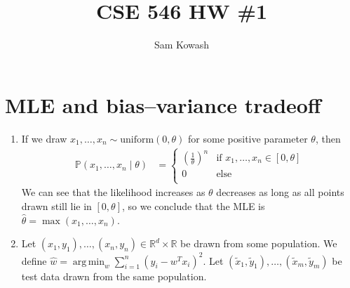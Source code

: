 \documentclass[11pt,letterpaper]{article}
\author{Sam Kowash}
\title{CSE 546 HW \#1}
\DeclareMathOperator*{\argmin}{arg\,min}
\numberwithin{equation}{section}
\numberwithin{figure}{section}
\begin{document}
\maketitle


\section{MLE and bias--variance tradeoff}
\begin{enumerate}
	\item If we draw $x_1,\ldots,x_n \sim \text{uniform}(0,\theta)$ for some positive parameter $\theta$, then
	\begin{align*}
		\mathbb{P}(x_1,\ldots,x_n \mid \theta) &= \left\{\begin{array}{ll}
			\left(\frac{1}{\theta}\right)^n & \text{if } x_1,\ldots,x_n \in [0,\theta]\\
			0 & \text{else}\\
			\end{array}\right.
	\end{align*}
	We can see that the likelihood increases as $\theta$ decreases as long as all points drawn still lie in $[0,\theta]$, so we conclude that the MLE is $\hat{\theta} = \max(x_1,\ldots,x_n)$.




	\item Let $(x_1,y_1),\ldots,(x_n,y_n) \in \mathbb{R}^d \times \mathbb{R}$ be drawn from some population. We define $\hat{w} = \argmin_{w} \sum_{i=1}^n (y_i - w^T x_i)^2$. Let $(\tilde{x}_1,\tilde{y}_1),\ldots,(\tilde{x}_m,\tilde{y}_m)$ be test data drawn from the same population. 
\end{enumerate}
\end{document}
